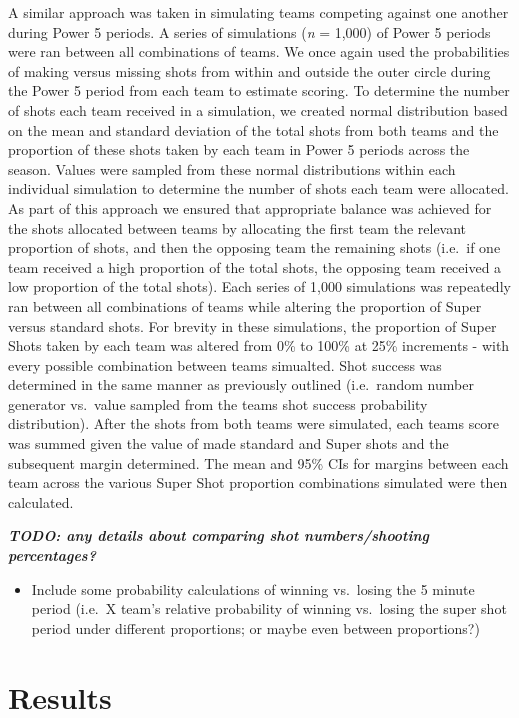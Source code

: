 \documentclass[]{elsarticle} %
\providecommand{\tightlist}{%
  \setlength{\itemsep}{0pt}\setlength{\parskip}{0pt}}
\begin{document}
A similar approach was taken in simulating teams competing against one
another during Power 5 periods. A series of simulations (\emph{n} =
1,000) of Power 5 periods were ran between all combinations of teams. We
once again used the probabilities of making versus missing shots from
within and outside the outer circle during the Power 5 period from each
team to estimate scoring. To determine the number of shots each team
received in a simulation, we created normal distribution based on the
mean and standard deviation of the total shots from both teams and the
proportion of these shots taken by each team in Power 5 periods across
the season. Values were sampled from these normal distributions within
each individual simulation to determine the number of shots each team
were allocated. As part of this approach we ensured that appropriate
balance was achieved for the shots allocated between teams by allocating
the first team the relevant proportion of shots, and then the opposing
team the remaining shots (i.e.~if one team received a high proportion of
the total shots, the opposing team received a low proportion of the
total shots). Each series of 1,000 simulations was repeatedly ran
between all combinations of teams while altering the proportion of Super
versus standard shots. For brevity in these simulations, the proportion
of Super Shots taken by each team was altered from 0\% to 100\% at 25\%
increments - with every possible combination between teams simualted.
Shot success was determined in the same manner as previously outlined
(i.e.~random number generator vs.~value sampled from the teams shot
success probability distribution). After the shots from both teams were
simulated, each teams score was summed given the value of made standard
and Super shots and the subsequent margin determined. The mean and 95\%
CIs for margins between each team across the various Super Shot
proportion combinations simulated were then calculated.

\textbf{\emph{TODO: any details about comparing shot numbers/shooting
percentages?}}

\begin{itemize}
\tightlist
\item
  Include some probability calculations of winning vs.~losing the 5
  minute period (i.e.~X team's relative probability of winning
  vs.~losing the super shot period under different proportions; or maybe
  even between proportions?)
\end{itemize}

\hypertarget{results}{%
\section{Results}\label{results}}
\end{document}
